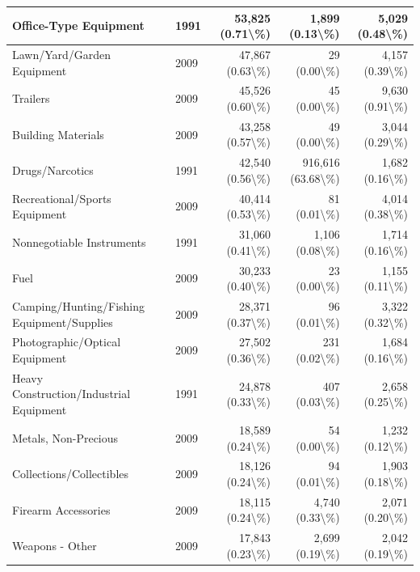 \documentclass[
]{krantz}
\begin{document}
\begin{longtable}[t]{l|l|r|r|r}
\hline
Office-Type Equipment & 1991 & 53,825 (0.71\textbackslash{}\%) & 1,899 (0.13\textbackslash{}\%) & 5,029 (0.48\textbackslash{}\%)\\
\hline
Lawn/Yard/Garden Equipment & 2009 & 47,867 (0.63\textbackslash{}\%) & 29 (0.00\textbackslash{}\%) & 4,157 (0.39\textbackslash{}\%)\\
\hline
Trailers & 2009 & 45,526 (0.60\textbackslash{}\%) & 45 (0.00\textbackslash{}\%) & 9,630 (0.91\textbackslash{}\%)\\
\hline
Building Materials & 2009 & 43,258 (0.57\textbackslash{}\%) & 49 (0.00\textbackslash{}\%) & 3,044 (0.29\textbackslash{}\%)\\
\hline
Drugs/Narcotics & 1991 & 42,540 (0.56\textbackslash{}\%) & 916,616 (63.68\textbackslash{}\%) & 1,682 (0.16\textbackslash{}\%)\\
\hline
Recreational/Sports Equipment & 2009 & 40,414 (0.53\textbackslash{}\%) & 81 (0.01\textbackslash{}\%) & 4,014 (0.38\textbackslash{}\%)\\
\hline
Nonnegotiable Instruments & 1991 & 31,060 (0.41\textbackslash{}\%) & 1,106 (0.08\textbackslash{}\%) & 1,714 (0.16\textbackslash{}\%)\\
\hline
Fuel & 2009 & 30,233 (0.40\textbackslash{}\%) & 23 (0.00\textbackslash{}\%) & 1,155 (0.11\textbackslash{}\%)\\
\hline
Camping/Hunting/Fishing Equipment/Supplies & 2009 & 28,371 (0.37\textbackslash{}\%) & 96 (0.01\textbackslash{}\%) & 3,322 (0.32\textbackslash{}\%)\\
\hline
Photographic/Optical Equipment & 2009 & 27,502 (0.36\textbackslash{}\%) & 231 (0.02\textbackslash{}\%) & 1,684 (0.16\textbackslash{}\%)\\
\hline
Heavy Construction/Industrial Equipment & 1991 & 24,878 (0.33\textbackslash{}\%) & 407 (0.03\textbackslash{}\%) & 2,658 (0.25\textbackslash{}\%)\\
\hline
Metals, Non-Precious & 2009 & 18,589 (0.24\textbackslash{}\%) & 54 (0.00\textbackslash{}\%) & 1,232 (0.12\textbackslash{}\%)\\
\hline
Collections/Collectibles & 2009 & 18,126 (0.24\textbackslash{}\%) & 94 (0.01\textbackslash{}\%) & 1,903 (0.18\textbackslash{}\%)\\
\hline
Firearm Accessories & 2009 & 18,115 (0.24\textbackslash{}\%) & 4,740 (0.33\textbackslash{}\%) & 2,071 (0.20\textbackslash{}\%)\\
\hline
Weapons - Other & 2009 & 17,843 (0.23\textbackslash{}\%) & 2,699 (0.19\textbackslash{}\%) & 2,042 (0.19\textbackslash{}\%)\\

\end{longtable}
\end{document}
